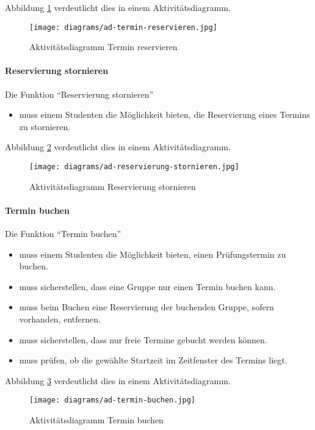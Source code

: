 Abbildung \ref{fig:ad-termin-reservieren} verdeutlicht dies in einem Aktivitätsdiagramm.

\begin{figure}
  \centering
  \texttt{[image: diagrams/ad-termin-reservieren.jpg]}
  \caption{Aktivitätsdiagramm Termin reservieren}
  \label{fig:ad-termin-reservieren}
\end{figure}

\paragraph{Reservierung stornieren}

Die Funktion ``Reservierung stornieren''
\begin{itemize}
  \item muss einem Studenten die Möglichkeit bieten, die Reservierung eines Termins zu stornieren.
\end{itemize}

Abbildung \ref{fig:ad-reservierung-stornieren} verdeutlicht dies in einem Aktivitätsdiagramm.

\begin{figure}
  \centering
  \texttt{[image: diagrams/ad-reservierung-stornieren.jpg]}
  \caption{Aktivitätsdiagramm Reservierung stornieren}
  \label{fig:ad-reservierung-stornieren}
\end{figure}

\paragraph{Termin buchen}

Die Funktion ``Termin buchen''
\begin{itemize}
  \item muss einem Studenten die Möglichkeit bieten, einen Prüfungstermin zu buchen.
  \item muss sicherstellen, dass eine Gruppe nur einen Termin buchen kann.
  \item muss beim Buchen eine Reservierung der buchenden Gruppe, sofern vorhanden, entfernen.
  \item muss sicherstellen, dass nur freie Termine gebucht werden können.
  \item muss prüfen, ob die gewählte Startzeit im Zeitfenster des Termins liegt.
\end{itemize}

Abbildung \ref{fig:ad-termin-buchen} verdeutlicht dies in einem Aktivitätsdiagramm.

\begin{figure}
  \centering
  \texttt{[image: diagrams/ad-termin-buchen.jpg]}
  \caption{Aktivitätsdiagramm Termin buchen}
  \label{fig:ad-termin-buchen}
\end{figure}

